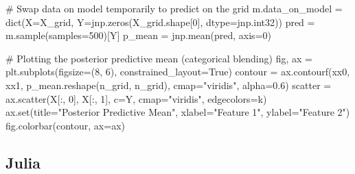 \documentclass[
  letterpaper,
  DIV=11,
  numbers=noendperiod]{scrartcl}
\newenvironment{Shaded}{\begin{snugshade}}{\end{snugshade}}
\newcommand{\BuiltInTok}[1]{\textcolor[rgb]{0.00,0.23,0.31}{#1}}
\newcommand{\CommentTok}[1]{\textcolor[rgb]{0.37,0.37,0.37}{#1}}
\newcommand{\DecValTok}[1]{\textcolor[rgb]{0.68,0.00,0.00}{#1}}
\newcommand{\FloatTok}[1]{\textcolor[rgb]{0.68,0.00,0.00}{#1}}
\newcommand{\NormalTok}[1]{\textcolor[rgb]{0.00,0.23,0.31}{#1}}
\newcommand{\OperatorTok}[1]{\textcolor[rgb]{0.37,0.37,0.37}{#1}}
\newcommand{\StringTok}[1]{\textcolor[rgb]{0.13,0.47,0.30}{#1}}
\newcommand{\VariableTok}[1]{\textcolor[rgb]{0.07,0.07,0.07}{#1}}
\begin{document}
\begin{Shaded}
\begin{Highlighting}[]
\CommentTok{\# Swap data on model temporarily to predict on the grid}
\NormalTok{m.data\_on\_model }\OperatorTok{=} \BuiltInTok{dict}\NormalTok{(X}\OperatorTok{=}\NormalTok{X\_grid, Y}\OperatorTok{=}\NormalTok{jnp.zeros(X\_grid.shape[}\DecValTok{0}\NormalTok{], dtype}\OperatorTok{=}\NormalTok{jnp.int32))}
\NormalTok{pred }\OperatorTok{=}\NormalTok{ m.sample(samples}\OperatorTok{=}\DecValTok{500}\NormalTok{)[}\StringTok{\textquotesingle{}Y\textquotesingle{}}\NormalTok{]}
\NormalTok{p\_mean }\OperatorTok{=}\NormalTok{ jnp.mean(pred, axis}\OperatorTok{=}\DecValTok{0}\NormalTok{)}

\CommentTok{\# Plotting the posterior predictive mean (categorical blending)}
\NormalTok{fig, ax }\OperatorTok{=}\NormalTok{ plt.subplots(figsize}\OperatorTok{=}\NormalTok{(}\DecValTok{8}\NormalTok{, }\DecValTok{6}\NormalTok{), constrained\_layout}\OperatorTok{=}\VariableTok{True}\NormalTok{)}
\NormalTok{contour }\OperatorTok{=}\NormalTok{ ax.contourf(xx0, xx1, p\_mean.reshape(n\_grid, n\_grid), cmap}\OperatorTok{=}\StringTok{"viridis"}\NormalTok{, alpha}\OperatorTok{=}\FloatTok{0.6}\NormalTok{)}
\NormalTok{scatter }\OperatorTok{=}\NormalTok{ ax.scatter(X[:, }\DecValTok{0}\NormalTok{], X[:, }\DecValTok{1}\NormalTok{], c}\OperatorTok{=}\NormalTok{Y, cmap}\OperatorTok{=}\StringTok{"viridis"}\NormalTok{, edgecolors}\OperatorTok{=}\StringTok{\textquotesingle{}k\textquotesingle{}}\NormalTok{)}
\NormalTok{ax.}\BuiltInTok{set}\NormalTok{(title}\OperatorTok{=}\StringTok{"Posterior Predictive Mean"}\NormalTok{, xlabel}\OperatorTok{=}\StringTok{"Feature 1"}\NormalTok{, ylabel}\OperatorTok{=}\StringTok{"Feature 2"}\NormalTok{)}
\NormalTok{fig.colorbar(contour, ax}\OperatorTok{=}\NormalTok{ax)}
\end{Highlighting}
\end{Shaded}

\subsection{Julia}
\end{document}
